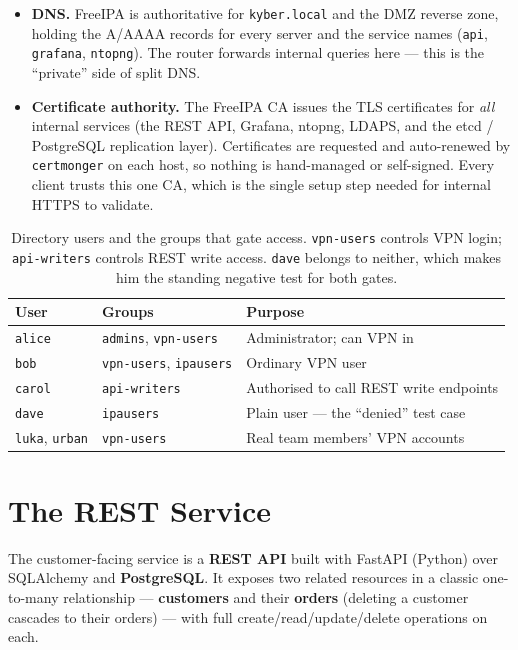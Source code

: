 \documentclass[11pt,a4paper]{article}
\newcommand{\code}[1]{\texttt{#1}}
\begin{document}
\begin{itemize}
  \item \textbf{DNS.} FreeIPA is authoritative for \code{kyber.local} and the DMZ reverse
        zone, holding the A/AAAA records for every server and the service names
        (\code{api}, \code{grafana}, \code{ntopng}). The router forwards internal queries
        here --- this is the ``private'' side of split DNS.
  \item \textbf{Certificate authority.} The FreeIPA CA issues the TLS certificates for
        \emph{all} internal services (the REST API, Grafana, ntopng, LDAPS, and the etcd /
        PostgreSQL replication layer). Certificates are requested and auto-renewed by
        \code{certmonger} on each host, so nothing is hand-managed or self-signed. Every
        client trusts this one CA, which is the single setup step needed for internal HTTPS
        to validate.
\end{itemize}

\begin{table}[htbp]
\centering
\small
\begin{tabular}{@{}l l l@{}}
\toprule
\textbf{User} & \textbf{Groups} & \textbf{Purpose} \\
\midrule
\code{alice} & \code{admins}, \code{vpn-users}      & Administrator; can VPN in \\
\code{bob}   & \code{vpn-users}, \code{ipausers}    & Ordinary VPN user \\
\code{carol} & \code{api-writers}                   & Authorised to call REST write endpoints \\
\code{dave}  & \code{ipausers}                      & Plain user --- the ``denied'' test case \\
\code{luka}, \code{urban} & \code{vpn-users}        & Real team members' VPN accounts \\
\bottomrule
\end{tabular}
\caption{Directory users and the groups that gate access. \code{vpn-users} controls VPN
         login; \code{api-writers} controls REST write access. \code{dave} belongs to
         neither, which makes him the standing negative test for both gates.}
\label{tab:users}
\end{table}

\section{The REST Service}
\label{sec:api}

The customer-facing service is a \textbf{REST API} built with FastAPI (Python) over
SQLAlchemy and \textbf{PostgreSQL}. It exposes two related resources in a classic
one-to-many relationship --- \textbf{customers} and their \textbf{orders} (deleting a
customer cascades to their orders) --- with full create/read/update/delete operations on
each.
\end{document}
